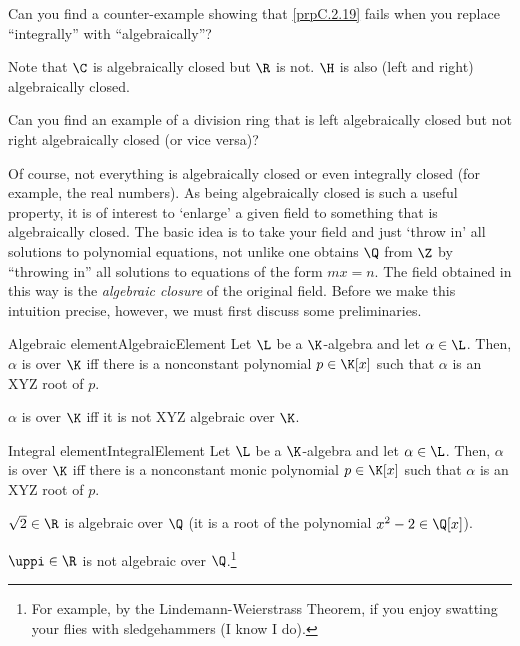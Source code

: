 \begin{exr}{}{}
	Can you find a counter-example showing that \cref{prpC.2.19} fails when you replace ``integrally'' with ``algebraically''?
\end{exr}
\begin{exm}{}{}
	Note that $\C$ is algebraically closed but $\R$ is not.  $\H$ is also (left and right) algebraically closed.
\end{exm}
\begin{exr}{}{}
	Can you find an example of a division ring that is left algebraically closed but not right algebraically closed (or vice versa)?
\end{exr}
Of course, not everything is algebraically closed or even integrally closed (for example, the real numbers).  As being algebraically closed is such a useful property, it is of interest to `enlarge' a given field to something that is algebraically closed.  The basic idea is to take your field and just `throw in' all solutions to polynomial equations, not unlike one obtains $\Q$ from $\Z$ by ``throwing in'' all solutions to equations of the form $mx=n$.  The field obtained in this way is the \emph{algebraic closure} of the original field.  Before we make this intuition precise, however, we must first discuss some preliminaries.
\begin{mdf}{Algebraic element}{AlgebraicElement}
	Let $\L$ be a $\K$-algebra and let $\alpha \in \L$.  Then, $\alpha$ is  over $\K$ iff there is a nonconstant polynomial $p\in \K [x]$ such that $\alpha$ is an XYZ root of $p$.
	
	$\alpha$ is  over $\K$ iff it is not XYZ algebraic over $\K$.
\end{mdf}
\begin{mdf}{Integral element}{IntegralElement}
	Let $\L$ be a $\K$-algebra and let $\alpha \in \L$.  Then, $\alpha$ is  over $\K$ iff there is a nonconstant monic polynomial $p\in \K [x]$ such that $\alpha$ is an XYZ root of $p$.
\end{mdf}
\begin{exm}{}{}
	$\sqrt{2}\in \R$ is algebraic over $\Q$ (it is a root of the polynomial $x^2-2\in \Q [x]$).
	
	$\uppi \in \R$ is not algebraic over $\Q$.\footnote{For example, by the Lindemann-Weierstrass Theorem, if you enjoy swatting your flies with sledgehammers (I know I do).}
\end{exm}
